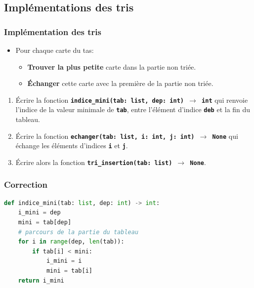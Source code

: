\documentclass[svgnames,11pt]{beamer}
\begin{document}
\subsection{Implémentations des tris}
\begin{frame}
    \frametitle{Implémentation des tris}

    \begin{itemize}
        \item Pour chaque carte du tas:
              \begin{itemize}
                  \item \textbf{Trouver la plus petite} carte dans la partie non triée.
                  \item \textbf{Échanger} cette carte avec la première de la partie non triée.
              \end{itemize}

    \end{itemize}

    \begin{activite}
        \begin{enumerate}
            \item Écrire la fonction \textbf{\texttt{indice\_mini(tab: list, dep: int) $\rightarrow$ int}} qui renvoie l'indice de la valeur minimale de \textbf{\texttt{tab}}, entre l'élément d'indice \textbf{\texttt{deb}} et la fin du tableau.
            \item Écrire la fonction \textbf{\texttt{echanger(tab: list, i: int, j: int) $\rightarrow$ None}} qui échange les éléments d'indices \textbf{\texttt{i}} et \textbf{\texttt{j}}.
            \item Écrire alors la fonction \textbf{\texttt{tri\_insertion(tab: list) $\rightarrow$ None}}.
        \end{enumerate}
    \end{activite}

\end{frame}
\begin{frame}[fragile]
    \frametitle{Correction}

    \begin{center}
        \begin{lstlisting}[language=Python , basicstyle=\ttfamily\small, xleftmargin=2em, xrightmargin=0em]
def indice_mini(tab: list, dep: int) -> int:
    i_mini = dep
    mini = tab[dep]
    # parcours de la partie du tableau
    for i in range(dep, len(tab)):
        if tab[i] < mini:
            i_mini = i
            mini = tab[i]
    return i_mini
\end{lstlisting}
    \end{center}

\end{frame}
\end{document}
